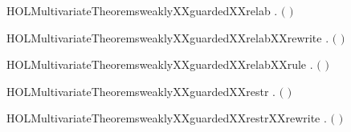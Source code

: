 \newcommand{\HOLMultivariateTheoremsweaklyXXguardedXXrecXXrule}{\UseVerbatim{HOLMultivariateTheoremsweaklyXXguardedXXrecXXrule}}
\begin{SaveVerbatim}{HOLMultivariateTheoremsweaklyXXguardedXXrelab}
\HOLTokenTurnstile{} \HOLSymConst{\HOLTokenForall{}}  .
         \ensuremath{(}  \ensuremath{)} \HOLSymConst{\HOLTokenImp{}}   
\end{SaveVerbatim}
\newcommand{\HOLMultivariateTheoremsweaklyXXguardedXXrelab}{\UseVerbatim{HOLMultivariateTheoremsweaklyXXguardedXXrelab}}
\begin{SaveVerbatim}{HOLMultivariateTheoremsweaklyXXguardedXXrelabXXrewrite}
\HOLTokenTurnstile{} \HOLSymConst{\HOLTokenForall{}}  .
         \ensuremath{(}  \ensuremath{)} \HOLSymConst{\HOLTokenEquiv{}}   
\end{SaveVerbatim}
\newcommand{\HOLMultivariateTheoremsweaklyXXguardedXXrelabXXrewrite}{\UseVerbatim{HOLMultivariateTheoremsweaklyXXguardedXXrelabXXrewrite}}
\begin{SaveVerbatim}{HOLMultivariateTheoremsweaklyXXguardedXXrelabXXrule}
\HOLTokenTurnstile{} \HOLSymConst{\HOLTokenForall{}}  .
          \HOLSymConst{\HOLTokenImp{}}   \ensuremath{(}  \ensuremath{)}
\end{SaveVerbatim}
\newcommand{\HOLMultivariateTheoremsweaklyXXguardedXXrelabXXrule}{\UseVerbatim{HOLMultivariateTheoremsweaklyXXguardedXXrelabXXrule}}
\begin{SaveVerbatim}{HOLMultivariateTheoremsweaklyXXguardedXXrestr}
\HOLTokenTurnstile{} \HOLSymConst{\HOLTokenForall{}}  .   \ensuremath{(}  \ensuremath{)} \HOLSymConst{\HOLTokenImp{}}   
\end{SaveVerbatim}
\newcommand{\HOLMultivariateTheoremsweaklyXXguardedXXrestr}{\UseVerbatim{HOLMultivariateTheoremsweaklyXXguardedXXrestr}}
\begin{SaveVerbatim}{HOLMultivariateTheoremsweaklyXXguardedXXrestrXXrewrite}
\HOLTokenTurnstile{} \HOLSymConst{\HOLTokenForall{}}  .   \ensuremath{(}  \ensuremath{)} \HOLSymConst{\HOLTokenEquiv{}}   
\end{SaveVerbatim}
